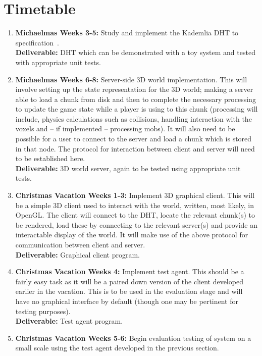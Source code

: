\documentclass[12pt,a4paper]{article}
\begin{document}
	\section{Timetable}
	
	\begin{enumerate}
		\item \textbf{Michaelmas Weeks 3-5:} Study and implement the Kademlia DHT to specification~\cite{kademlia}.\\
		\textbf{Deliverable:} DHT which can be demonstrated with a toy system and tested with appropriate unit tests.
		\item \textbf{Michaelmas Weeks 6-8:} Server-side 3D world implementation. This will involve setting up the state representation for the 3D world; making a server able to load a chunk from disk and then to complete the necessary processing to update the game state while a player is using to this chunk (processing will include, physics calculations such as collisions, handling interaction with the voxels and -- if implemented -- processing mobs). It will also need to be possible for a user to connect to the server and load a chunk which is stored in that node. The protocol for interaction between client and server will need to be established here.\\
		\textbf{Deliverable:} 3D world server, again to be tested using appropriate unit tests.
		\item \textbf{Christmas Vacation Weeks 1-3:} Implement 3D graphical client. This will be a simple 3D client used to interact with the world, written, most likely, in OpenGL. The client will connect to the DHT, locate the relevant chunk(s) to be rendered, load these by connecting to the relevant server(s) and provide an interactable display of the world. It will make use of the above protocol for communication between client and server.\\
		\textbf{Deliverable:} Graphical client program.
		\item \textbf{Christmas Vacation Weeks 4:} Implement test agent. This should be a fairly easy task as it will be a paired down version of the client developed earlier in the vacation. This is to be used in the evaluation stage and will have no graphical interface by default (though one may be pertinent for testing purposes).\\
		\textbf{Deliverable:} Test agent program.
		\item \textbf{Christmas Vacation Weeks 5-6:} Begin evaluation testing of system on a small scale using the test agent developed in the previous section.\\

\end{enumerate}
\end{document}
